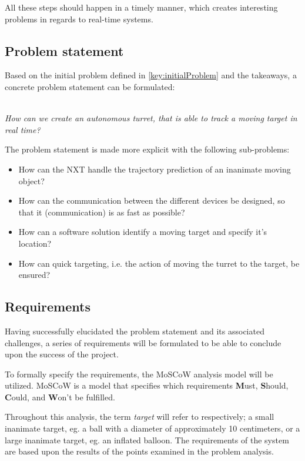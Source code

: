All these steps should happen in a timely manner, which creates interesting problems in regards to real-time systems.

\subsection{Problem statement}
Based on the initial problem defined in \autoref{key:initialProblem} and the takeaways, a concrete problem statement can be formulated:\\~\\

\begin{center}
	\textit{\large{How can we create an autonomous turret, that is able to track a moving target in real time?}}
\end{center}

The problem statement is made more explicit with the following sub-problems:
\begin{center}
	\begin{itemize}
		\item How can the NXT handle the trajectory prediction of an inanimate moving object?
		\item How can the communication between the different devices be designed, so that it (communication) is as fast as possible?
		\item How can a software solution identify a moving target and specify it's location?
		\item How can quick targeting, i.e. the action of moving the turret to the target, be ensured?
	\end{itemize}
\end{center}


\subsection{Requirements}\label{subsec:requirements}
Having successfully elucidated the problem statement and its associated challenges, a series of requirements will be formulated to be able to conclude upon the success of the project.

To formally specify the requirements, the MoSCoW analysis model will be utilized.
MoSCoW is a model that specifies which requirements \textbf{M}ust, \textbf{S}hould, \textbf{C}ould, and \textbf{W}on't be fulfilled.

Throughout this analysis, the term \textit{target} will refer to respectively; a small inanimate target, eg{.} a ball with a diameter of approximately 10 centimeters, or a large inanimate target, eg{.} an inflated balloon.
The requirements of the system are based upon the results of the points examined in the problem analysis.

